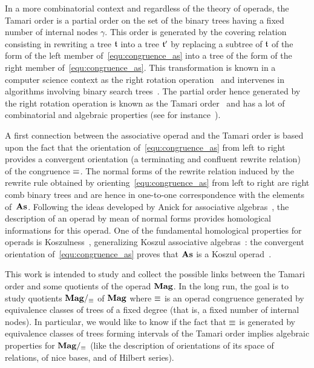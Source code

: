 In a more combinatorial context and regardless of the theory of operads,
the Tamari order is a partial order on the set of the binary trees
having a fixed number of internal nodes $\gamma$. This order is
generated by the covering relation consisting in rewriting a tree $\mathfrak{t}$
into a tree $\mathfrak{t}'$ by replacing a subtree of $\mathfrak{t}$ of the form of the
left member of~\eqref{equ:congruence_as} into a tree of the form of the
right member of~\eqref{equ:congruence_as}. This transformation is known
in a computer science context as the right rotation
operation~\cite{Knu98} and intervenes in algorithms involving binary
search trees~\cite{AVL62}. The partial order hence generated by the
right rotation operation is known as the Tamari order~\cite{Tam62} and
has a lot of combinatorial and algebraic properties (see for
instance~\cite{HT72,Cha06}).
\medbreak

A first connection between the associative operad and the Tamari order
is based upon the fact that the orientation of~\eqref{equ:congruence_as}
from left to right provides a convergent orientation (a terminating and
confluent rewrite relation) of the congruence $\operatorname{\equiv}$. The normal
forms of the rewrite relation induced by the rewrite rule obtained by
orienting~\eqref{equ:congruence_as} from left to right are right comb
binary trees and are hence in one-to-one correspondence with the
elements of~$\mathbf{As}$. Following the ideas developed by Anick for
associative algebras~\cite{Ani86}, the description of an operad by mean
of normal forms provides homological informations for this operad. One of
the fundamental homological properties for operads is
Koszulness~\cite{GK94}, generalizing Koszul associative
algebras~\cite{Pri70}: the convergent orientation
of~\eqref{equ:congruence_as} proves that $\mathbf{As}$ is a Koszul
operad~\cite{DK10,LV12}.
\medbreak

This work is intended to study and collect the possible links between
the Tamari order and some quotients of the operad $\mathbf{Mag}$. In the long
run, the goal is to study quotients $\mathbf{Mag}/_{\operatorname{\equiv}}$ of $\mathbf{Mag}$ where
$\operatorname{\equiv}$ is an operad congruence generated by equivalence classes of
trees of a fixed degree (that is, a fixed number of internal nodes). In
particular, we would like to know if the fact that $\operatorname{\equiv}$ is generated
by equivalence classes of trees forming intervals of the Tamari order
implies algebraic properties for $\mathbf{Mag}/_{\operatorname{\equiv}}$ (like the description
of orientations of its space of relations, of nice bases, and of Hilbert
series).
\medbreak

